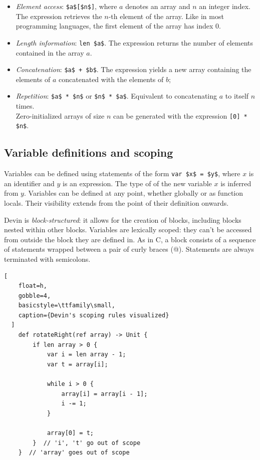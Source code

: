 \documentclass[UdineBachThesis,american,11pt,draft]{PhdThesis}
\begin{document}
  \begin{itemize}
    \item \emph{Element access}: \lstinline[mathescape]@$a$[$n$]@, where $a$
    denotes an array and $n$ an integer index. The expression retrieves the
    $n$-th element of the array. Like in most programming languages, the first
    element of the array has index $0$.

    \item \emph{Length information}: \lstinline[mathescape]@len $a$@. The
    expression returns the number of elements contained in the array $a$.

    \item \emph{Concatenation}: \lstinline[mathescape]@$a$ + $b$@. The
    expression yields a new array containing the elements of $a$ concatenated
    with the elements of $b$;

    \item \emph{Repetition}: \lstinline[mathescape]@$a$ * $n$@ or
    \lstinline[mathescape]@$n$ * $a$@. Equivalent to concatenating $a$ to itself
    $n$ times. \\
    Zero-initialized arrays of size $n$ can be generated with the expression
    \lstinline[mathescape]@[0] * $n$@.
  \end{itemize}

  \subsection{Variable definitions and scoping}

  Variables can be defined using statements of the form
  \lstinline[mathescape]@var $x$ = $y$@, where $x$ is an identifier and $y$ is
  an expression. The type of of the new variable $x$ is inferred from $y$.
  Variables can be defined at any point, whether globally or as function locals.
  Their visibility extends from the point of their definition onwards.

  Devin is \emph{block-structured}: it allows for the creation of blocks,
  including blocks nested within other blocks. Variables are lexically scoped:
  they can't be accessed from outside the block they are defined in. As in C, a
  block consists of a sequence of statements wrapped between a pair of curly
  braces (@). Statements are always terminated with
  semicolons.

  \begin{lstlisting}[
    float=h,
    gobble=4,
    basicstyle=\ttfamily\small,
    caption={Devin's scoping rules visualized}
  ]
    def rotateRight(ref array) -> Unit {
        if len array > 0 {
            var i = len array - 1;
            var t = array[i];

            while i > 0 {
                array[i] = array[i - 1];
                i -= 1;
            }

            array[0] = t;
        }  // 'i', 't' go out of scope
    }  // 'array' goes out of scope
  \end{lstlisting}
\end{document}

